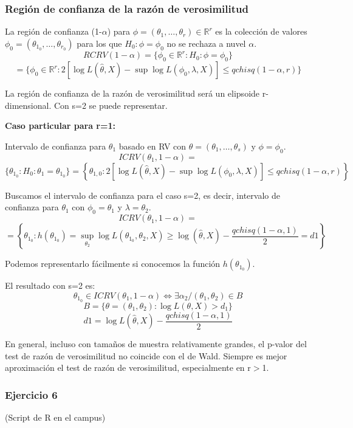\subsubsection{Región de confianza de la razón de verosimilitud}

La región de confianza (1-$\alpha$) para $\phi=(\theta_1,\dots,\theta_r)\in \mathbb{R}^r$ es la colección de valores
$\phi_0=(\theta_{1_0},\dots,\theta_{r_0})$ para los que $H_0:\phi=\phi_0$ no se rechaza a nuvel $\alpha$.
\[
RCRV(1-\alpha)=\{\phi_0 \in \mathbb{R}^r:H_0:\phi=\phi_0\}
\]\[
    =\{\phi_0 \in \mathbb{R}^r:2[\log L(\hat{\theta},X)-\sup \log L(\phi_0,\lambda,X)] \leq qchisq(1-\alpha,r)\}
\]

La región de confianza de la razón de verosimilitud será un elipsoide r-dimensional. Con s=2 se puede representar.

\textbf{Caso particular para r=1:}

Intervalo de confianza para $\theta_1$ basado en RV con $\theta=(\theta_1,\dots,\theta_s)$ y $\phi=\phi_0$.
\[
ICRV(\theta_1,1-\alpha)=
\]\[\{\theta_{1_0}:H_0:\theta_1=\theta_{1_0}\}
= \left\{ \theta_{1,0} : 2\left[\log L(\hat{\theta},X) - \sup \log L(\phi_0, \lambda, X)\right] \leq qchisq(1 - \alpha, r) \right\}
\]

Buscamos el intervalo de confianza para el caso s=2, es decir, intervalo de confianza para $\theta_1$ con $\phi_0=\theta_1$ y $\lambda=\theta_2$.
\[
ICRV(\theta_1,1-\alpha)=
\]\[
=\left\{ 
\theta_{1_0}:h(\theta_{1_0})=\sup_{\theta_2} \log L(\theta_{1_0},\theta_2,X) \geq \log(\hat{\theta},X)-\frac{qchisq(1-\alpha,1)}{2}=d1
\right\}
\]

Podemos representarlo fácilmente si conocemos la función $h(\theta_{1_0})$.

El resultado con s=2 es:
\[
\theta_{1_0} \in  ICRV(\theta_1,1-\alpha) \Longleftrightarrow \exists \alpha_2 / (\theta_1,\theta_2) \in B
\]
\[
B=\{\theta=(\theta_1,\theta_2):\log L(\theta,X)>d_1\}
\]
\[
d1=\log L(\hat{\theta},X)-\frac{qchisq(1-\alpha,1)}{2}
\]

En general, incluso con tamaños de muestra relativamente grandes, el p-valor del test de razón de verosimilitud no coincide con el de Wald.
Siempre es mejor aproximación el test de razón de verosimilitud, especialmente en r$>$1.
\newpage
\subsubsection*{Ejercicio 6}
(Script de R en el campus)

